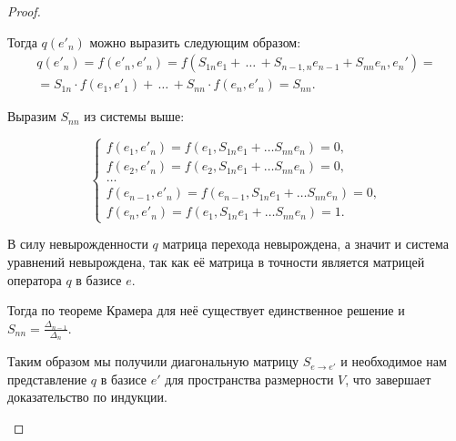 \begin{proof}
\begin{enumerate}
        Тогда $q(e'_n)$ можно выразить следующим образом: \begin{gather*}
            q(e'_n) = f(e'_n, e'_n) = f(S_{1n} e_1 + \, \dots \, + S_{n-1, n} e_{n-1} + S_{nn}e_n, e_n') = \\
            = S_{1n} \cdot f(e_1, e'_1) + \, \dots \, + S_{nn} \cdot f(e_n, e'_n) = S_{nn}. 
        \end{gather*}  
        
        Выразим $S_{nn}$ из системы выше:

        \begin{equation*}
            \begin{cases}
                f(e_1, e'_n) = f(e_1, S_{1n}e_1 + \dots S_{nn}e_n) = 0,         \\
                f(e_2, e'_n) = f(e_2, S_{1n}e_1 + \dots S_{nn}e_n) = 0,         \\
                \dots                                                           \\
                f(e_{n-1}, e'_n) = f(e_{n-1}, S_{1n}e_1 + \dots S_{nn}e_n) = 0, \\
                f(e_n, e'_n) = f(e_1, S_{1n}e_1 + \dots S_{nn}e_n) = 1.
            \end{cases}
        \end{equation*}

        В силу невырожденности $q$ матрица перехода невырождена, а значит и система уравнений невырождена,
        так как её матрица в точности является матрицей оператора $q$ в базисе $e$.
        
        Тогда по теореме Крамера для неё существует единственное решение и $S_{nn} = \frac{\Delta_{n-1}}{\Delta_n}$.

        Таким образом мы получили диагональную матрицу $S_{e \to e'}$ и необходимое нам представление 
        $q$ в базисе $e'$ для пространства размерности $V$, что завершает доказательство по индукции.
    \end{enumerate} 
\end{proof}
